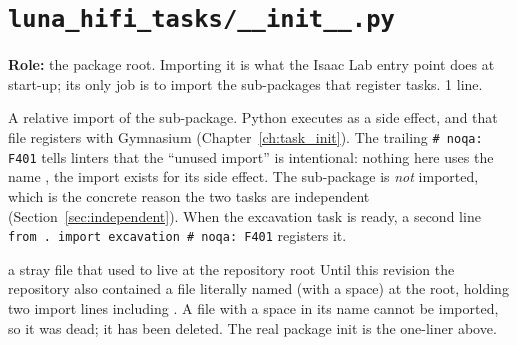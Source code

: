 \chapter{\texttt{luna\_hifi\_tasks/\_\_init\_\_.py}}
\label{ch:package_init}

\textbf{Role:} the package root. Importing it is what the Isaac Lab entry point
does at start-up; its only job is to import the sub-packages that register
tasks. 1 line.


\begin{explain}
 A relative import of the  sub-package. Python executes
   as a side effect, and that file
  registers  with Gymnasium
  (Chapter~\ref{ch:task_init}). The trailing \texttt{\# noqa: F401} tells linters
  that the ``unused import'' is intentional: nothing here uses the name
  , the import exists for its side effect.
  The  sub-package is \emph{not} imported, which is the
  concrete reason the two tasks are independent (Section~\ref{sec:independent}).
  When the excavation task is ready, a second line
  \texttt{from . import excavation  \# noqa: F401} registers it.
\end{explain}

\begin{warnbox}{a stray file that used to live at the repository root}
Until this revision the repository also contained a file literally named
 (with a space) at the root, holding two import lines
including . A file with a space in its name cannot be
imported, so it was dead; it has been deleted. The real package init is the
one-liner above.
\end{warnbox}
